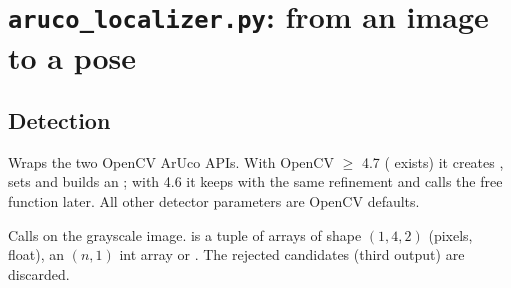 \section{\texttt{aruco\_localizer.py}: from an image to a pose}

\subsection{Detection}

Wraps the two OpenCV ArUco APIs. With OpenCV $\geq$ 4.7 ( exists) it creates
, sets  and builds an
; with 4.6 it keeps  with the same refinement and calls the free
function later. All other detector parameters are OpenCV defaults.

Calls  on the grayscale image.  is a tuple of arrays of shape $(1,4,2)$ (pixels,
float),  an $(n,1)$ int array or . The rejected candidates (third output) are discarded.

